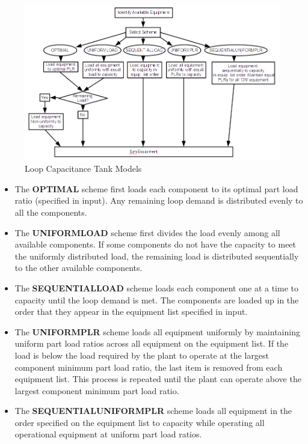 \begin{figure}[hbtp] %
\centering
\includegraphics{media/image1974.png}\caption{Loop Capacitance Tank Models \protect \label{loop-capacitance-tank-models}}
\end{figure}

\begin{itemize}
\item
    The \textbf{OPTIMAL} scheme first loads each component to its optimal part load ratio (specified in input). Any remaining loop demand is distributed evenly to all the components.
\item
    The \textbf{UNIFORMLOAD} scheme first divides the load evenly among all available components.
    If some components do not have the capacity to meet the uniformly distributed load, the remaining load is distributed sequentially to the other available components.
\item
    The \textbf{SEQUENTIALLOAD} scheme loads each component one at a time to capacity until the loop demand is met.
    The components are loaded up in the order that they appear in the equipment list specified in input.
\item
    The \textbf{UNIFORMPLR} scheme loads all equipment uniformly by maintaining uniform part load ratios across all equipment on the equipment list.
    If the load is below the load required by the plant to operate at the largest component minimum part load ratio, the last item is removed from each equipment list.
    This process is repeated until the plant can operate above the largest component minimum part load ratio.
\item
    The \textbf{SEQUENTIALUNIFORMPLR} scheme loads all equipment in the order specified on the equipment list to capacity while operating all operational equipment at uniform part load ratios.
\end{itemize}


